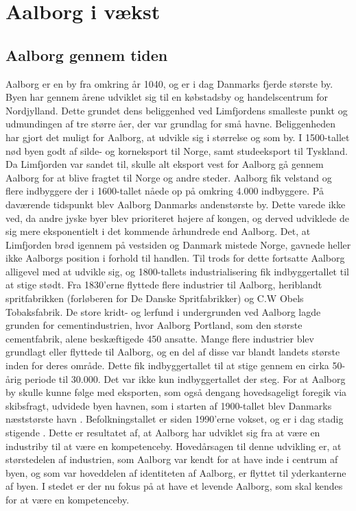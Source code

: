\chapter{Aalborg i vækst}

\section{Aalborg gennem tiden}
Aalborg er en by fra omkring år 1040, og er i dag Danmarks fjerde største by. Byen har gennem årene udviklet sig til en købstadsby og handelscentrum for Nordjylland. Dette grundet dens beliggenhed ved Limfjordens smalleste punkt og udmundingen af tre større åer, der var grundlag for små havne. Beliggenheden har gjort det muligt for Aalborg, at udvikle sig i størrelse og som by. I 1500-tallet nød byen godt af silde- og korneksport til Norge, samt studeeksport til Tyskland. Da Limfjorden var sandet til, skulle alt eksport vest for Aalborg gå gennem Aalborg for at blive fragtet til Norge og andre steder. Aalborg fik velstand og flere indbyggere der i 1600-tallet nåede op på omkring 4.000 indbyggere. På daværende tidspunkt blev Aalborg Danmarks andenstørste by. Dette varede ikke ved, da andre jyske byer blev prioriteret højere af kongen, og derved udviklede de sig mere eksponentielt i det kommende århundrede end Aalborg. Det, at Limfjorden brød igennem på vestsiden og Danmark mistede Norge, gavnede heller ikke Aalborgs position i forhold til handlen.
\newline \indent{     }  Til trods for dette fortsatte Aalborg alligevel med at udvikle sig, og 1800-tallets industrialisering fik indbyggertallet til at stige stødt. Fra 1830’erne flyttede flere industrier til Aalborg, heriblandt spritfabrikken (forløberen for De Danske Spritfabrikker) og C.W Obels Tobaksfabrik. De store kridt- og lerfund i undergrunden ved Aalborg lagde grunden for cementindustrien, hvor Aalborg Portland, som den største cementfabrik, alene beskæftigede 450 ansatte. Mange flere industrier blev grundlagt eller flyttede til Aalborg, og en del af disse var blandt landets største inden for deres område. Dette fik indbyggertallet til at stige gennem en cirka 50-årig periode til 30.000. Det var ikke kun indbyggertallet der steg. For at Aalborg by skulle kunne følge med eksporten, som også dengang hovedsageligt foregik via skibsfragt, udvidede byen havnen, som i starten af 1900-tallet blev Danmarks næststørste havn \citep{byhistorie}.
\newline \indent{     }  Befolkningstallet er siden 1990'erne vokset, og er i dag stadig stigende \citep{indbyggertal}. Dette er resultatet af, at Aalborg har udviklet sig fra at være en industriby til at være en kompetenceby. Hovedårsagen til denne udvikling er, at størstedelen af industrien, som Aalborg var kendt for at have inde i centrum af byen, og som var hoveddelen af identiteten af Aalborg, er flyttet til yderkanterne af byen. I stedet er der nu fokus på at have et levende Aalborg, som skal kendes for at være en kompetenceby.
